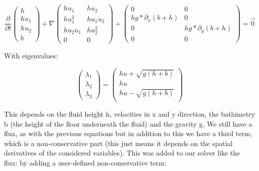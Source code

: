 \documentclass[12pt,letterpaper]{article}
\begin{document}
\begin{equation*} \label{SWE}
    \frac{\partial}{\partial t}\left(
    \begin{array}{lr} h \\
        h u_1 \\
        h u_2 \\
        b 
        \end{array} \right) +
    \nabla \begin{pmatrix}
        h u_1           & h u_2     \\
        h u_1^2         & h u_1 u_2 \\
        h u_2 u_1       & h u_2^2   \\
        0               & 0
    \end{pmatrix} +
    \begin{pmatrix}
        0                     & 0\\
        h g*\partial_x(b+h)   & 0\\
        0                     & h g*\partial_y(b+h) \\
        0                     & 0
    \end{pmatrix}  = \vec{0}
\end{equation*}

With eigenvalues:

\begin{equation*}
    \left(
    \begin{array}{lr}
        \lambda_1 \\
        \lambda_2 \\
        \lambda_3 
    \end{array} \right) =
    \left(
    \begin{array}{lr}
        h u + \sqrt{g (h+b)} \\
        h u \\
        h u - \sqrt{g (h+b)} \\
    \end{array} \right)
\end{equation*}

This depends on the fluid height h, velocities in x and y direction, the bathimetry b (the height of the floor underneath the fluid) and the gravity g. We still have a flux, as with the previous equations but in addition to this we have a third term, which is a non-conservative part (this just means it depends on the spatial derivatives of the considered variables). This was added to our solver like the flux: by adding a user-defined non-conservative term:
\end{document}
